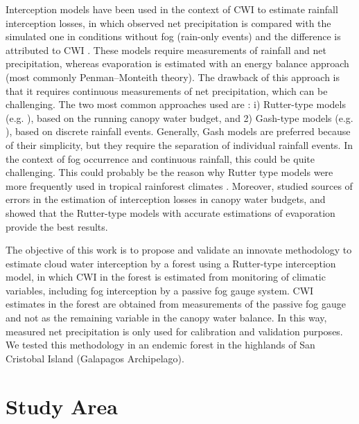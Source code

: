 \documentclass[a4paper,12pt]{article}
\begin{document}
\begin{linenumbers}
Interception models have been used in the context of CWI to estimate rainfall interception losses, in which observed net precipitation is compared with the simulated one in conditions without fog (rain-only events) and the difference is attributed to CWI \citep{Holwerdaetal2010, Pryetetal2012a}. These models require measurements of rainfall and net precipitation, whereas evaporation is estimated with an energy balance approach (most commonly Penman–Monteith theory). The drawback of this approach is that it requires continuous measurements of net precipitation, which can be challenging.  The two most common approaches used are \citep{Muzyloetal2009}:  i) Rutter-type models (e.g. \cite{Liu1997, Rutter1975}), based on the running canopy water budget, and 2) Gash-type models (e.g. \cite{Gash1979, Zengetal2000}), based on discrete rainfall events. Generally, Gash models are preferred because of their simplicity, but they require the separation of individual rainfall events. In the context of fog occurrence and continuous rainfall, this could be quite challenging. This could probably be the reason why Rutter type models were more frequently used in tropical rainforest climates \citep{Muzyloetal2009}. Moreover, \cite{vanDijketal2015} studied sources of errors in the estimation of interception losses in canopy water budgets, and showed that the Rutter-type models with accurate estimations of evaporation provide the best results. 

The objective of this work is to propose and validate an innovate methodology to estimate cloud water interception by a forest using a Rutter-type interception model, in which CWI in the forest is estimated from monitoring of climatic variables, including fog interception by a passive fog gauge system. CWI estimates in the forest are obtained from measurements of the passive fog gauge and not as the remaining variable in the canopy water balance. In this way, measured net precipitation is only used for calibration and validation purposes. We tested this methodology in an endemic forest in the highlands of San Cristobal Island (Galapagos Archipelago). 

\section{Study Area}

\end{linenumbers}
\end{document}
